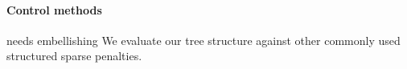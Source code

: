 \documentclass{article}
\begin{document}
\paragraph{Control methods}
{\color{red} needs embellishing}
We evaluate our tree structure against other commonly used structured sparse
penalties.


\end{document}

